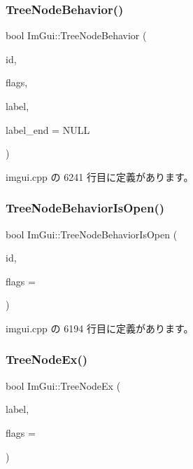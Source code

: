 \subsubsection{\texorpdfstring{Tree\+Node\+Behavior()}{TreeNodeBehavior()}}
{\footnotesize\ttfamily bool Im\+Gui\+::\+Tree\+Node\+Behavior (\begin{DoxyParamCaption}\item[{\mbox{\hyperlink{imgui_8h_a1785c9b6f4e16406764a85f32582236f}{Im\+Gui\+ID}}}]{id,  }\item[{\mbox{\hyperlink{imgui_8h_a0588fdd10c59b49a0159484fe9ec4564}{Im\+Gui\+Tree\+Node\+Flags}}}]{flags,  }\item[{const char $\ast$}]{label,  }\item[{const char $\ast$}]{label\+\_\+end = {\ttfamily NULL} }\end{DoxyParamCaption})}



 imgui.\+cpp の 6241 行目に定義があります。

\mbox{\label{namespace_im_gui_a22cc50485aad6da8a3a4e156b500ed4a}} 
\subsubsection{\texorpdfstring{Tree\+Node\+Behavior\+Is\+Open()}{TreeNodeBehaviorIsOpen()}}
{\footnotesize\ttfamily bool Im\+Gui\+::\+Tree\+Node\+Behavior\+Is\+Open (\begin{DoxyParamCaption}\item[{\mbox{\hyperlink{imgui_8h_a1785c9b6f4e16406764a85f32582236f}{Im\+Gui\+ID}}}]{id,  }\item[{\mbox{\hyperlink{imgui_8h_a0588fdd10c59b49a0159484fe9ec4564}{Im\+Gui\+Tree\+Node\+Flags}}}]{flags = {} }\end{DoxyParamCaption})}



 imgui.\+cpp の 6194 行目に定義があります。

\mbox{\label{namespace_im_gui_a21f62e092dac9556a15a8edee2f70522}} 
\subsubsection{\texorpdfstring{Tree\+Node\+Ex()}{TreeNodeEx()}\hspace{0.1cm}{\footnotesize\ttfamily [1/3]}}
{\footnotesize\ttfamily bool Im\+Gui\+::\+Tree\+Node\+Ex (\begin{DoxyParamCaption}\item[{const char $\ast$}]{label,  }\item[{\mbox{\hyperlink{imgui_8h_a0588fdd10c59b49a0159484fe9ec4564}{Im\+Gui\+Tree\+Node\+Flags}}}]{flags = {} }\end{DoxyParamCaption})}



